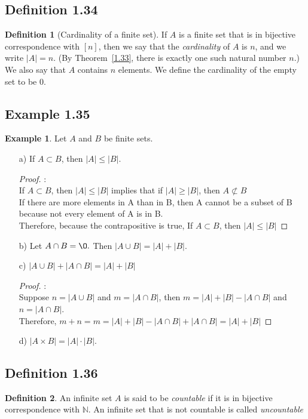\documentclass[openany, amssymb, psamsfonts]{amsart}
\newcommand{\bbN}{\mathbb{N}}
\renewcommand{\emptyset}{\O}
\newcommand{\abs}[1]{\lvert #1 \rvert}
\theoremstyle{definition}
\newtheorem{defn}{Definition}[section]
\newtheorem{exmp}{Example}[section]
\numberwithin{equation}{section}
\begin{document}
\subsection{Definition 1.34}
\begin{defn}[Cardinality of a finite set]
 If $A$ is a finite set that is in bijective correspondence with $[n]$, then we say that the \emph{cardinality} of $A$ is $n$, and we write $\abs{A} = n$.  (By   Theorem~\ref{1.33}, there is exactly one such natural number $n$.) We also say that $A$ contains $n$ elements. We define the cardinality of the empty set to be $0.$
\end{defn}
\subsection{Example 1.35}
\begin{exmp}
    Let $A$ and $B$ be finite sets. 
\begin{enumerate}
\item[a)]
 If $A\subset B$, then $|A|\leq |B|$.
\begin{proof}:\\
If $A\subset B$, then $|A|\leq |B|$ implies that if $|A|\geq |B|$, then $ A\not\subset B$\\
If there are more elements in A than in B, then A cannot be a subset of B because not every element of A is in B.\\
Therefore, because the contrapositive is true,  If $A\subset B$, then $|A|\leq |B|$
\end{proof}



\item[b)]
Let  $A\cap B=\emptyset.$ Then $|A\cup B|=|A|+|B|.$ 
\item[c)] 
$|A\cup B|+|A\cap B|=|A|+|B|$
\begin{proof}:\\
Suppose $ n= |A\cup B|$ and $ m=|A\cap B|$, then $m=|A|+|B|-|A\cap B|$ and $n=|A\cap B|$. \\
Therefore, $m+n = m=|A|+|B|-|A\cap B|+|A\cap B| = |A|+|B|$
\end{proof}
\item[d)]  
 $|A\times B|=|A|\cdot |B|$.
 \end{enumerate}
\end{exmp}

\subsection{Definition 1.36}
\label{1.36}
\begin{defn}
    An infinite set $A$ is said to be {\em countable} if it is in bijective correspondence with $\bbN.$ An infinite set that is not countable is called {\em uncountable}
\end{defn}
\end{document}
